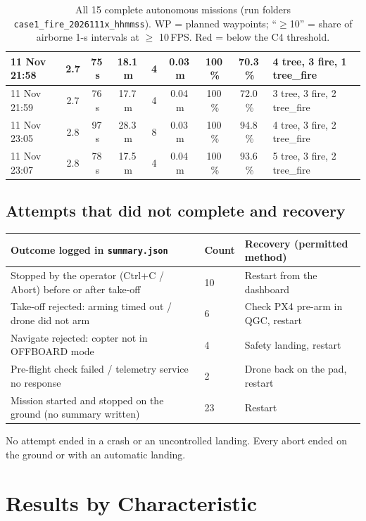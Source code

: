 \documentclass[10pt,a4paper]{article}
\newcommand{\head}[1]{\textbf{#1}}
\newcommand{\file}[1]{\texttt{\small #1}}
\begin{document}
\begin{table}[H]
\begin{tabular}{|l|c|c|c|c|c|c|c|l|}
11 Nov 21:58 & 2.7 & 75\,s & 18.1\,m & 4 & 0.03\,m & 100\,\% & \textcolor{failred}{70.3\,\%} & 4 tree, 3 fire, 1 tree\_fire \\ \hline
11 Nov 21:59 & 2.7 & 76\,s & 17.7\,m & 4 & 0.04\,m & 100\,\% & \textcolor{failred}{72.0\,\%} & 3 tree, 3 fire, 2 tree\_fire \\ \hline
11 Nov 23:05 & 2.8 & 97\,s & 28.3\,m & 8 & 0.03\,m & 100\,\% & 94.8\,\% & 4 tree, 3 fire, 2 tree\_fire \\ \hline
11 Nov 23:07 & 2.8 & 78\,s & 17.5\,m & 4 & 0.04\,m & 100\,\% & 93.6\,\% & 5 tree, 3 fire, 2 tree\_fire \\ \hline
\end{tabular}
\caption{All 15 complete autonomous missions (run folders \file{case1\_fire\_2026111x\_hhmmss}). WP = planned waypoints;
``$\ge$10'' = share of airborne 1-s intervals at $\ge$ 10\,FPS. Red = below the C4 threshold.}
\label{tab:flights}
\end{table}

\subsection{Attempts that did not complete and recovery}
\begin{tabularx}{\textwidth}{|L{6.6cm}|L{1.2cm}|Y|}
\hline
{}\head{Outcome logged in \file{summary.json}} & \head{Count} & \head{Recovery (permitted method)} \\ \hline
Stopped by the operator (Ctrl+C / Abort) before or after take-off & 10 & Restart from the dashboard \\ \hline
Take-off rejected: arming timed out / drone did not arm & 6 & Check PX4 pre-arm in QGC, restart \\ \hline
Navigate rejected: copter not in OFFBOARD mode & 4 & Safety landing, restart \\ \hline
Pre-flight check failed / telemetry service no response & 2 & Drone back on the pad, restart \\ \hline
Mission started and stopped on the ground (no summary written) & 23 & Restart \\ \hline
\end{tabularx}

No attempt ended in a crash or an uncontrolled landing. Every abort ended on the ground or with an automatic landing.

\section{Results by Characteristic}
\end{document}
